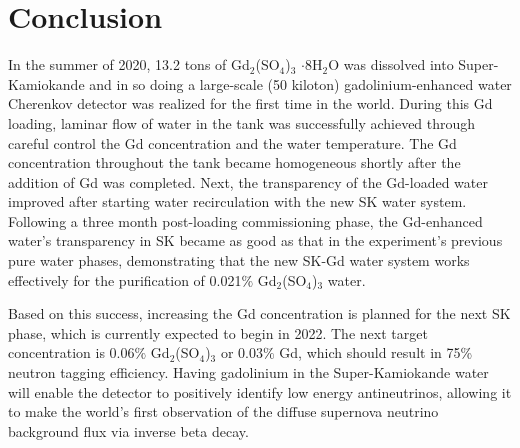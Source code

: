 \documentclass[preprint,12pt]{elsarticle}
\begin{document}

\section{Conclusion}
In the summer of 2020, 13.2 tons of Gd$_2$(SO$_4$)$_3$ $\cdot$8H$_2$O was dissolved into Super-Kamiokande and in so doing  a large-scale (50 kiloton) gadolinium-enhanced water Cherenkov detector was realized for the first time in the world.
During this Gd loading, laminar flow of water in the tank was successfully achieved through careful control the Gd concentration and the water temperature. The Gd concentration throughout the tank became homogeneous shortly after the addition of Gd was completed. Next, the transparency of the Gd-loaded water improved after starting water recirculation with the new SK water system. Following a three month post-loading commissioning phase, the Gd-enhanced water's transparency in SK became as good as that in the experiment's previous pure water phases, demonstrating that the new SK-Gd water system works effectively for the purification of 0.021$\%$ Gd$_2$(SO$_4$)$_3$ water.

Based on this success, increasing the Gd concentration is planned for the next SK phase, which is currently expected to begin in 2022. The next target concentration is 0.06$\%$ Gd$_2$(SO$_4$)$_3$ or 0.03$\%$ Gd, which should result in 75\% neutron tagging efficiency. 
Having gadolinium in the Super-Kamiokande water will enable the detector to positively identify low energy antineutrinos, allowing it to make the world's first observation of the diffuse supernova neutrino background flux via inverse beta decay.

\end{document}
